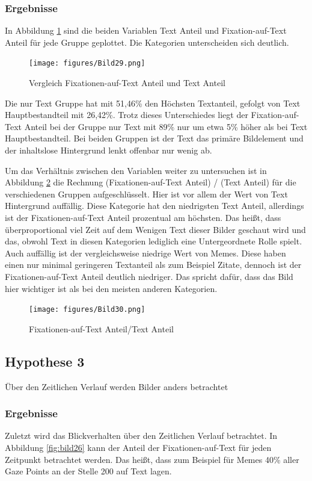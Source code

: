 \documentclass[
    language=german, %
    thesis=seminar, %
    supervisor=postdoc, %
    multiauthor=true, %
    ]{settings/csssa-thesis}
\begin{document}
\subsubsection{Ergebnisse}
In Abbildung \ref{fig:bild24} sind die beiden Variablen Text Anteil und Fixation-auf-Text Anteil für jede Gruppe geplottet. 
Die Kategorien unterscheiden sich deutlich.

\begin{figure}[h]
    \centering
    \texttt{[image: figures/Bild29.png]}
    \caption{Vergleich Fixationen-auf-Text Anteil und Text Anteil}\label{fig:bild24}
\end{figure}

Die nur Text Gruppe hat mit 51,46\% den Höchsten Textanteil, gefolgt von Text Hauptbestandteil 
mit 26,42\%. Trotz dieses Unterschiedes liegt der Fixation-auf-Text Anteil bei der Gruppe 
nur Text mit 89\% nur um etwa 5\% höher als bei Text Hauptbestandteil. Bei beiden Gruppen ist der 
Text das primäre Bildelement und der inhaltslose Hintergrund lenkt offenbar nur wenig ab. 

Um das Verhältnis zwischen den Variablen weiter zu untersuchen ist in Abbildung \ref{fig:bild25} die Rechnung 
(Fixationen-auf-Text Anteil) / (Text Anteil) für die verschiedenen Gruppen aufgeschlüsselt. 
Hier ist vor allem der Wert von Text Hintergrund auffällig. Diese Kategorie hat den niedrigsten 
Text Anteil, allerdings ist der Fixationen-auf-Text Anteil prozentual am höchsten. Das hei{\ss}t, 
dass überproportional viel Zeit auf dem Wenigen Text dieser Bilder geschaut wird und das, 
obwohl Text in diesen Kategorien lediglich eine Untergeordnete Rolle spielt. Auch auffällig 
ist der vergleichsweise niedrige Wert von Memes. Diese haben einen nur minimal geringeren 
Textanteil als zum Beispiel Zitate, dennoch ist der Fixationen-auf-Text Anteil deutlich niedriger. 
Das spricht dafür, dass das Bild hier wichtiger ist als bei den meisten anderen Kategorien.

\begin{figure}[h]
    \centering
    \texttt{[image: figures/Bild30.png]}
    \caption{Fixationen-auf-Text Anteil/Text Anteil}\label{fig:bild25}
\end{figure}

\subsection{Hypothese 3}
Über den Zeitlichen Verlauf werden Bilder anders betrachtet

\subsubsection{Ergebnisse}
Zuletzt wird das Blickverhalten über den Zeitlichen Verlauf betrachtet. In Abbildung \ref{fig:bild26} kann der 
Anteil der Fixationen-auf-Text für jeden Zeitpunkt betrachtet werden. Das hei{\ss}t, dass zum Beispiel 
für Memes 40\% aller Gaze Points an der Stelle 200 auf Text lagen. 
\end{document}
